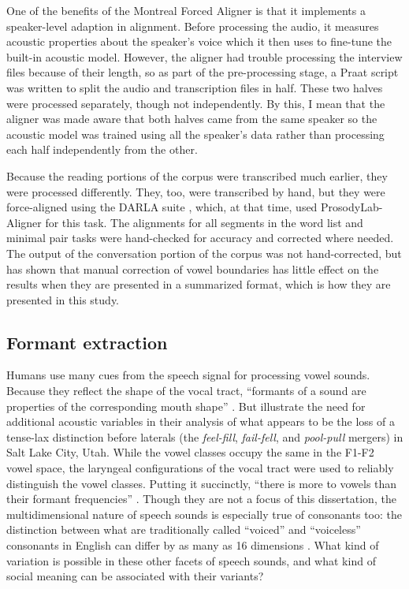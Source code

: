 One of the benefits of the Montreal Forced Aligner is that it implements a speaker-level adaption in alignment. Before processing the audio, it measures acoustic properties about the speaker’s voice which it then uses to fine-tune the built-in acoustic model. However, the aligner had trouble processing the interview files because of their length, so as part of the pre-processing stage, a Praat script was written to split the audio and transcription files in half. These two halves were processed separately, though not independently. By this, I mean that the aligner was made aware that both halves came from the same speaker so the acoustic model was trained using all the speaker’s data rather than processing each half independently from the other.

Because the reading portions of the corpus were transcribed much earlier, they were processed differently. They, too, were transcribed by hand, but they were force-aligned using the DARLA suite \citep{reddy_stanford_2015_DARLA}, which, at that time, used ProsodyLab-Aligner \citep{gorman_etal_2011_prosodylab} for this task. The alignments for all segments in the word list and minimal pair tasks were hand-checked for accuracy and corrected where needed. The output of the conversation portion of the corpus was not hand-corrected, but \citet{strelluf_2019} has shown that manual correction of vowel boundaries has little effect on the results when they are presented in a summarized format, which is how they are presented in this study.

\subsection{Formant extraction}
\label{formant_extraction}

Humans use many cues from the speech signal for processing vowel sounds. Because they reflect the shape of the vocal tract, ``formants of a sound are properties of the corresponding mouth shape'' \citep[98]{ladefoged_1996}. But \citet{dipaolo_faber_1990} illustrate the need for additional acoustic variables in their analysis of what appears to be the loss of a tense-lax distinction before laterals (the \textit{feel-fill}, \textit{fail-fell}, and \textit{pool-pull} mergers) in Salt Lake City, Utah. While the vowel classes occupy the same in the F1-F2 vowel space, the laryngeal configurations of the vocal tract were used to reliably distinguish the vowel classes. Putting it succinctly, ``there is more to vowels than their formant frequencies'' \citep[201]{dipaolo_faber_1990}. Though they are not a focus of this dissertation, the multidimensional nature of speech sounds is especially true of consonants too: the distinction between what are traditionally called ``voiced'' and ``voiceless'' consonants in English can differ by as many as 16 dimensions \citep{lisker_1986}. What kind of variation is possible in these other facets of speech sounds, and what kind of social meaning can be associated with their variants?

